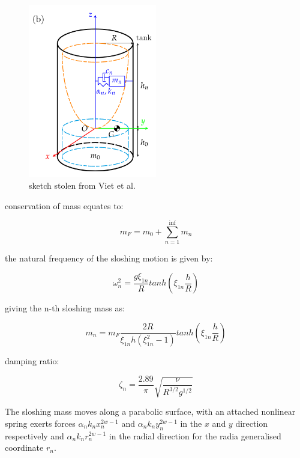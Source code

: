 \documentclass{ltxdockit}
\begin{document}
\begin{figure}
  \includegraphics[width=0.5\textwidth]{images/sloshing_visualisation.png}
  \caption{sketch stolen from Viet et al. \cite{viet_antisloshing_2024}}
\end{figure}

conservation of mass equates to:

\begin{equation}
m_F = m_0 + \sum_{n=1}^{\inf} m_n
\end{equation}

the natural frequency of the sloshing motion is given by:

\begin{equation}
\omega_{n}^{2} = \frac{g \xi_{1n}}{R}tanh\left(\xi_{1n} \frac{h}{R}\right)
\end{equation}

giving the n-th sloshing mass as:

\begin{equation}
m_n = m_F \frac{2R}{\xi_{1n}h(\xi_{1n}^2-1)}tanh\left(\xi_{1n} \frac{h}{R}\right)
\end{equation}

damping ratio:

\begin{equation}
\zeta_n = \frac{2.89}{\pi}\sqrt{\frac{\nu}{R^{3/2}g^{1/2}}}
\end{equation}

The sloshing mass moves along a parabolic surface, with an attached nonlinear spring exerts forces \(\alpha_n k_n x_{n}^{2w-1}\) and \(\alpha_n k_n y_{n}^{2w-1}\) in the \(x\) and \(y\) direction respectively and \(\alpha_n k_n r_{n}^{2w-1}\) in the radial direction for the radia generalised coordinate \(r_n\).
\end{document}
